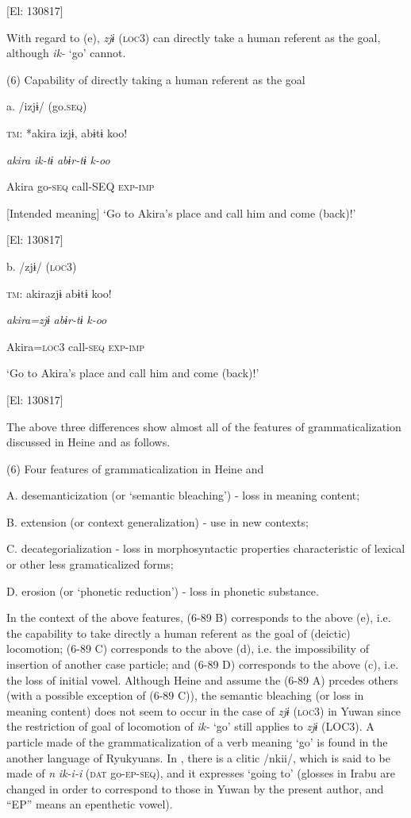     [El: 130817]

With regard to (e), \textit{zjɨ} (\textsc{loc}3) can directly take a human referent as the goal, although \textit{ik-} ‘go’ cannot.

(6)  Capability of directly taking a human referent as the goal

  a.  /izjɨ/ (go.\textsc{seq})

    \textsc{tm}:  *akira  izjɨ,  abɨtɨ  koo!

      \textit{akira}  \textit{ik-tɨ}  \textit{abɨr-tɨ}  \textit{k-oo}

      Akira  go-\textsc{seq}  call-SEQ  \textsc{exp}-\textsc{imp}

       [Intended meaning] ‘Go to Akira’s place and call him and come (back)!’

      [El: 130817]

  b.  /zjɨ/ (\textsc{loc}3)

    \textsc{tm}:  akirazjɨ  abɨtɨ  koo!

      \textit{akira=zjɨ}  \textit{abɨr-tɨ}  \textit{k-oo}

      Akira=\textsc{loc}3  call-\textsc{seq}  \textsc{exp}-\textsc{imp}

       ‘Go to Akira’s place and call him and come (back)!’

      [El: 130817]

The above three differences show almost all of the features of grammaticalization discussed in Heine and \citet[2]{Kuteva2002} as follows.

(6) Four features of grammaticalization in Heine and \citet[2]{Kuteva2002}

A.  desemanticization (or ‘semantic bleaching’) - loss in meaning content;

B.  extension (or context generalization) - use in new contexts;

C.    decategorialization - loss in morphosyntactic properties characteristic of lexical or other less gramaticalized forms;

D.  erosion (or ‘phonetic reduction’) - loss in phonetic substance.

In the context of the above features, (6-89 B) corresponds to the above (e), i.e. the capability to take directly a human referent as the goal of (deictic) locomotion; (6-89 C) corresponds to the above (d), i.e. the impossibility of insertion of another case particle; and (6-89 D) corresponds to the above (c), i.e. the loss of initial vowel. Although Heine and \citet[3]{Kuteva2002} assume the (6-89 A) prcedes others (with a possible exception of (6-89 C)), the semantic bleaching (or loss in meaning content) does not seem to occur in the case of \textit{zjɨ} (\textsc{loc}3) in Yuwan since the restriction of goal of locomotion of \textit{ik-} ‘go’ still applies to \textit{zjɨ} (LOC3). A particle made of the grammaticalization of a verb meaning ‘go’ is found in the another language of Ryukyuans. In \citet[207]{Shimoji2008}, there is a clitic /nkii/, which is said to be made of \textit{n} \textit{ik-i-i} (\textsc{dat} go-\textsc{ep}-\textsc{seq}), and it expresses ‘going to’ (glosses in Irabu are changed in order to correspond to those in Yuwan by the present author, and “EP” means an epenthetic vowel).

